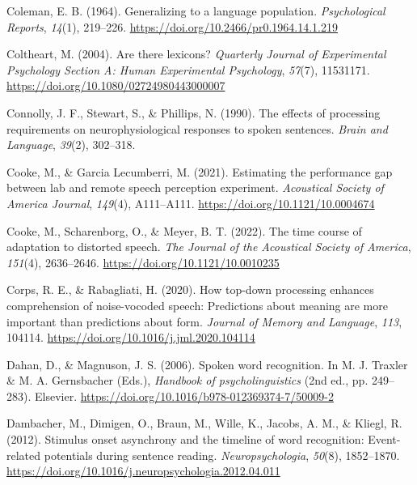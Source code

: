 \documentclass[a4paper, nobind]{templates/ociamthesis}
\newlength{\cslhangindent}
\newenvironment{CSLReferences}[2] %
 {%
  \setlength{\parindent}{0pt}
  \ifodd #1
  \let\oldpar\par
  \def\par{\hangindent=\cslhangindent\oldpar}
  \fi
  \setlength{\parskip}{1mm}
  \setlength{\baselineskip}{6mm}
 }%
 {}
\begin{document}
\begin{CSLReferences}{1}{0}
\leavevmode{}%
Coleman, E. B. (1964). {Generalizing to a language population}. \emph{Psychological Reports}, \emph{14}(1), 219--226. \url{https://doi.org/10.2466/pr0.1964.14.1.219}

\leavevmode{}%
Coltheart, M. (2004). Are there lexicons? \emph{Quarterly Journal of Experimental Psychology Section A: Human Experimental Psychology}, \emph{57}(7), 11531171. \url{https://doi.org/10.1080/02724980443000007}

\leavevmode{}%
Connolly, J. F., Stewart, S., \& Phillips, N. (1990). The effects of processing requirements on neurophysiological responses to spoken sentences. \emph{Brain and Language}, \emph{39}(2), 302--318.

\leavevmode{}%
Cooke, M., \& Garcia Lecumberri, M. (2021). Estimating the performance gap between lab and remote speech perception experiment. \emph{Acoustical Society of America Journal}, \emph{149}(4), A111--A111. \url{https://doi.org/10.1121/10.0004674}

\leavevmode{}%
Cooke, M., Scharenborg, O., \& Meyer, B. T. (2022). The time course of adaptation to distorted speech. \emph{The Journal of the Acoustical Society of America}, \emph{151}(4), 2636--2646. \url{https://doi.org/10.1121/10.0010235}

\leavevmode{}%
Corps, R. E., \& Rabagliati, H. (2020). How top-down processing enhances comprehension of noise-vocoded speech: Predictions about meaning are more important than predictions about form. \emph{Journal of Memory and Language}, \emph{113}, 104114. \url{https://doi.org/10.1016/j.jml.2020.104114}

\leavevmode{}%
Dahan, D., \& Magnuson, J. S. (2006). Spoken word recognition. In M. J. Traxler \& M. A. Gernsbacher (Eds.), \emph{Handbook of psycholinguistics} (2nd ed., pp. 249--283). Elsevier. \url{https://doi.org/10.1016/b978-012369374-7/50009-2}

\leavevmode{}%
Dambacher, M., Dimigen, O., Braun, M., Wille, K., Jacobs, A. M., \& Kliegl, R. (2012). {Stimulus onset asynchrony and the timeline of word recognition: Event-related potentials during sentence reading}. \emph{Neuropsychologia}, \emph{50}(8), 1852--1870. \url{https://doi.org/10.1016/j.neuropsychologia.2012.04.011}


\end{CSLReferences}
\end{document}
